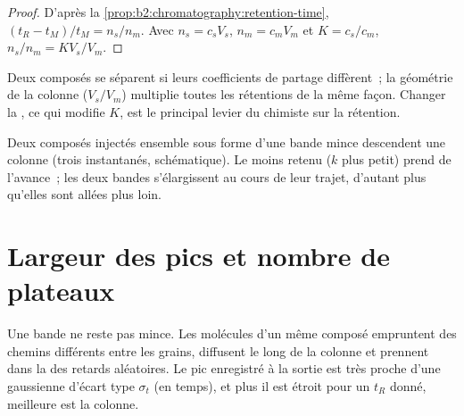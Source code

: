 \begin{proof}
D'après la \cref{prop:b2:chromatography:retention-time}, $(t_R - t_M)/t_M = n_s/n_m$. Avec $n_s = c_sV_s$,
$n_m = c_mV_m$ et $K = c_s/c_m$, $n_s/n_m = KV_s/V_m$.
\end{proof}

Deux composés se séparent si leurs coefficients de partage diffèrent~; la géométrie de la colonne
($V_s/V_m$) multiplie toutes les rétentions de la même façon. Changer la , ce qui modifie $K$,
est le principal levier du chimiste sur la rétention.

\begin{omfigure}
\par\vspace{4pt}

{\small Deux composés injectés ensemble sous forme d'une bande mince descendent une colonne (trois
instantanés, schématique). Le moins retenu ($k$ plus petit) prend de l'avance~; les deux bandes
s'élargissent au cours de leur trajet, d'autant plus qu'elles sont allées plus loin.}
\end{omfigure}

\section{Largeur des pics et nombre de plateaux}

Une bande ne reste pas mince. Les molécules d'un même composé empruntent des chemins différents entre les
grains, diffusent le long de la colonne et prennent dans la  des retards aléatoires. Le
pic enregistré à la sortie est très proche d'une gaussienne d'écart type $\sigma_t$ (en temps), et plus
il est étroit pour un $t_R$ donné, meilleure est la colonne.

